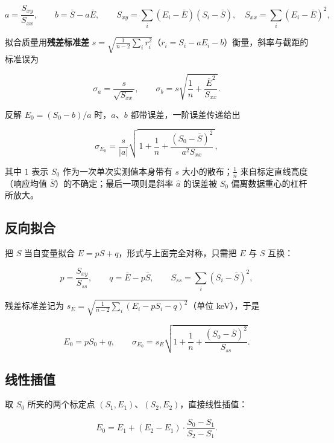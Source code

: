 \documentclass[UTF8,a4paper,12pt]{ctexart}
\begin{document}
\begin{equation}
  a=\frac{S_{xy}}{S_{xx}},\qquad b=\bar S-a\bar E ,
\qquad
  S_{xy}=\sum_i(E_i-\bar E)(S_i-\bar S),\quad
  S_{xx}=\sum_i(E_i-\bar E)^2 ,
\end{equation}

拟合质量用\textbf{残差标准差} $s=\sqrt{\frac{1}{n-2}\sum_i r_i^2}$（$r_i=S_i-aE_i-b$）衡量，斜率与截距的标准误为

\begin{equation}
  \sigma_a=\frac{s}{\sqrt{S_{xx}}},\qquad
  \sigma_b=s\sqrt{\frac1n+\frac{\bar E^2}{S_{xx}}} .
\end{equation}

反解 $E_0=(S_0-b)/a$ 时，$a$、$b$ 都带误差，一阶误差传递给出

\begin{equation}
  \sigma_{E_0}=\frac{s}{|a|}\sqrt{\,1+\frac1n+\frac{(S_0-\bar S)^2}{a^2S_{xx}}\,},
\end{equation}

其中 $1$ 表示 $S_0$ 作为一次单次实测值本身带有 $s$ 大小的散布；$\frac1n$ 来自标定直线高度（响应均值 $\bar S$）的不确定；最后一项则是斜率 $\hat a$ 的误差被 $S_0$ 偏离数据重心的杠杆所放大。

\subsection{反向拟合}

把 $S$ 当自变量拟合 $E=pS+q$，形式与上面完全对称，只需把 $E$ 与 $S$ 互换：

\begin{equation}
  p=\frac{S_{xy}}{S_{ss}},\qquad q=\bar E-p\bar S ,\qquad
  S_{ss}=\sum_i(S_i-\bar S)^2 ,
\end{equation}

残差标准差记为 $s_E=\sqrt{\frac{1}{n-2}\sum_i(E_i-pS_i-q)^2}$（单位 keV），于是

\begin{equation}
  E_0=pS_0+q,\qquad
  \sigma_{E_0}=s_E\sqrt{1+\frac1n+\frac{(S_0-\bar S)^2}{S_{ss}}} .
\end{equation}

\subsection{线性插值}

取 $S_0$ 所夹的两个标定点 $(S_1,E_1)$、$(S_2,E_2)$，直接线性插值：

\begin{equation}
  E_0=E_1+(E_2-E_1)\cdot\frac{S_0-S_1}{S_2-S_1}.
\end{equation}
\end{document}
